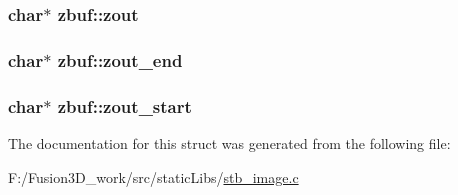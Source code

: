 \subsubsection[{zout}]{\setlength{\rightskip}{0pt plus 5cm}char$\ast$ zbuf\+::zout}\label{structzbuf_aaf137c25fa5b9fb14e92354da4203c38}
\hypertarget{structzbuf_af07c0b7b7227f670ee1413bc0dcab791}{}
\subsubsection[{zout\+\_\+end}]{\setlength{\rightskip}{0pt plus 5cm}char$\ast$ zbuf\+::zout\+\_\+end}\label{structzbuf_af07c0b7b7227f670ee1413bc0dcab791}
\hypertarget{structzbuf_af31571e8d74c78c9bb18d92205150b28}{}
\subsubsection[{zout\+\_\+start}]{\setlength{\rightskip}{0pt plus 5cm}char$\ast$ zbuf\+::zout\+\_\+start}\label{structzbuf_af31571e8d74c78c9bb18d92205150b28}


The documentation for this struct was generated from the following file\+:\begin{DoxyCompactItemize}
\item 
F\+:/\+Fusion3\+D\+\_\+work/src/static\+Libs/\hyperlink{stb__image_8c}{stb\+\_\+image.\+c}\end{DoxyCompactItemize}
